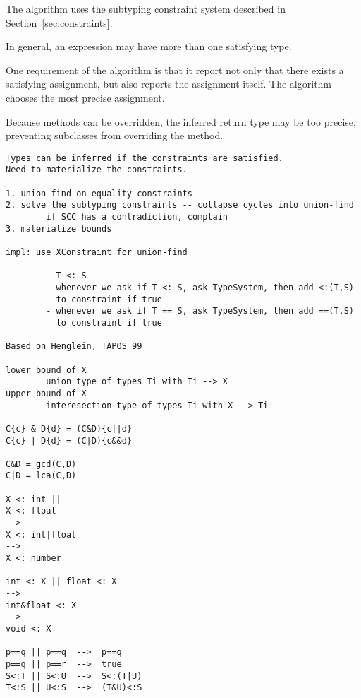 \documentclass[nocopyrightspace,9pt]{sigplanconf}
\begin{document}
The algorithm uses the subtyping constraint system described in
Section~\ref{sec:constraints}.

In general, an expression may have more than one satisfying type.

One requirement of the algorithm
is that it report not only that there exists a satisfying
assignment, but also reports the assignment itself.
The algorithm chooses the most precise assignment.

Because methods can be overridden, the inferred return type may be too
precise, preventing subclasses from overriding the method.


\begin{verbatim}
Types can be inferred if the constraints are satisfied.
Need to materialize the constraints.

1. union-find on equality constraints
2. solve the subtyping constraints -- collapse cycles into union-find
        if SCC has a contradiction, complain
3. materialize bounds

impl: use XConstraint for union-find

        - T <: S
        - whenever we ask if T <: S, ask TypeSystem, then add <:(T,S)
          to constraint if true
        - whenever we ask if T == S, ask TypeSystem, then add ==(T,S)
          to constraint if true

Based on Henglein, TAPOS 99

lower bound of X
        union type of types Ti with Ti --> X
upper bound of X
        interesection type of types Ti with X --> Ti
        
C{c} & D{d} = (C&D){c||d}
C{c} | D{d} = (C|D){c&&d}

C&D = gcd(C,D)
C|D = lca(C,D)

X <: int ||
X <: float
-->
X <: int|float
-->
X <: number

int <: X || float <: X
-->
int&float <: X
-->
void <: X

p==q || p==q  -->  p==q
p==q || p==r  -->  true
S<:T || S<:U  -->  S<:(T|U)
T<:S || U<:S  -->  (T&U)<:S

\end{verbatim}
\end{document}
